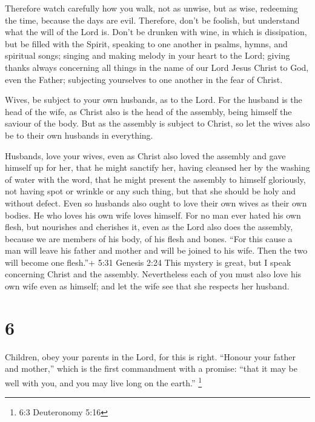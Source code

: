  Therefore watch carefully how you walk, not as unwise, but
as wise,  redeeming the time, because the days are evil.
 Therefore, don't be foolish, but understand what the will
of the Lord is.  Don't be drunken with wine, in which is
dissipation, but be filled with the Spirit,  speaking to
one another in psalms, hymns, and spiritual songs; singing and making
melody in your heart to the Lord;  giving thanks always
concerning all things in the name of our Lord Jesus Christ to God, even
the Father;  subjecting yourselves to one another in the
fear of Christ.

 Wives, be subject to your own husbands, as to the Lord.
 For the husband is the head of the wife, as Christ also is
the head of the assembly, being himself the saviour of the body.
 But as the assembly is subject to Christ, so let the wives
also be to their own husbands in everything.

 Husbands, love your wives, even as Christ also loved the
assembly and gave himself up for her,  that he might
sanctify her, having cleansed her by the washing of water with the word,
 that he might present the assembly to himself gloriously,
not having spot or wrinkle or any such thing, but that she should be
holy and without defect.  Even so husbands also ought to
love their own wives as their own bodies. He who loves his own wife
loves himself.  For no man ever hated his own flesh, but
nourishes and cherishes it, even as the Lord also does the assembly,
 because we are members of his body, of his flesh and
bones.  ``For this cause a man will leave his father and
mother and will be joined to his wife. Then the two will become one
flesh.''+ 5:31 Genesis 2:24  This mystery is great, but I
speak concerning Christ and the assembly.  Nevertheless
each of you must also love his own wife even as himself; and let the
wife see that she respects her husband.

\hypertarget{section-5}{%
\section{6}\label{section-5}}

 Children, obey your parents in the Lord, for this is right.
 ``Honour your father and mother,'' which is the first
commandment with a promise:  ``that it may be well with you,
and you may live long on the earth.'' \footnote{6:3 Deuteronomy 5:16}

